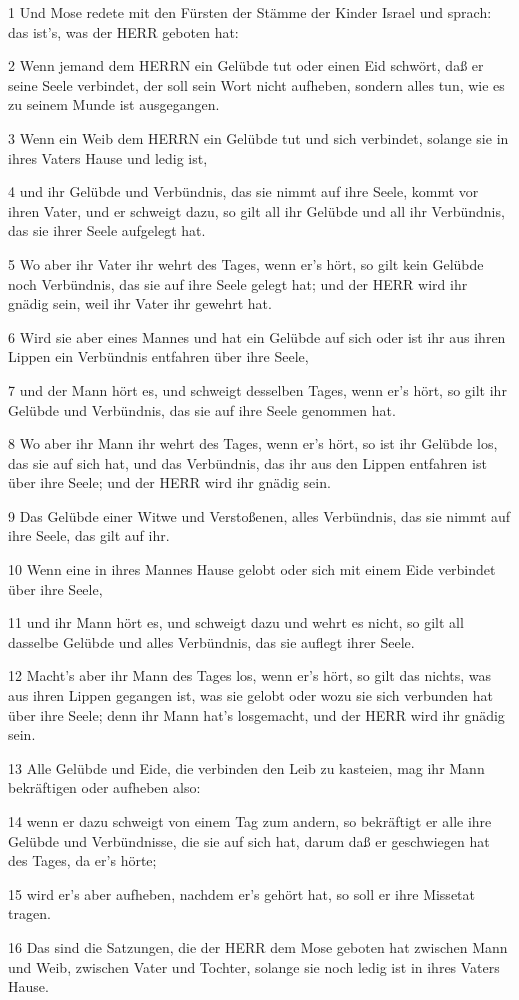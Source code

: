 \par 1 Und Mose redete mit den Fürsten der Stämme der Kinder Israel und sprach: das ist's, was der HERR geboten hat:
\par 2 Wenn jemand dem HERRN ein Gelübde tut oder einen Eid schwört, daß er seine Seele verbindet, der soll sein Wort nicht aufheben, sondern alles tun, wie es zu seinem Munde ist ausgegangen.
\par 3 Wenn ein Weib dem HERRN ein Gelübde tut und sich verbindet, solange sie in ihres Vaters Hause und ledig ist,
\par 4 und ihr Gelübde und Verbündnis, das sie nimmt auf ihre Seele, kommt vor ihren Vater, und er schweigt dazu, so gilt all ihr Gelübde und all ihr Verbündnis, das sie ihrer Seele aufgelegt hat.
\par 5 Wo aber ihr Vater ihr wehrt des Tages, wenn er's hört, so gilt kein Gelübde noch Verbündnis, das sie auf ihre Seele gelegt hat; und der HERR wird ihr gnädig sein, weil ihr Vater ihr gewehrt hat.
\par 6 Wird sie aber eines Mannes und hat ein Gelübde auf sich oder ist ihr aus ihren Lippen ein Verbündnis entfahren über ihre Seele,
\par 7 und der Mann hört es, und schweigt desselben Tages, wenn er's hört, so gilt ihr Gelübde und Verbündnis, das sie auf ihre Seele genommen hat.
\par 8 Wo aber ihr Mann ihr wehrt des Tages, wenn er's hört, so ist ihr Gelübde los, das sie auf sich hat, und das Verbündnis, das ihr aus den Lippen entfahren ist über ihre Seele; und der HERR wird ihr gnädig sein.
\par 9 Das Gelübde einer Witwe und Verstoßenen, alles Verbündnis, das sie nimmt auf ihre Seele, das gilt auf ihr.
\par 10 Wenn eine in ihres Mannes Hause gelobt oder sich mit einem Eide verbindet über ihre Seele,
\par 11 und ihr Mann hört es, und schweigt dazu und wehrt es nicht, so gilt all dasselbe Gelübde und alles Verbündnis, das sie auflegt ihrer Seele.
\par 12 Macht's aber ihr Mann des Tages los, wenn er's hört, so gilt das nichts, was aus ihren Lippen gegangen ist, was sie gelobt oder wozu sie sich verbunden hat über ihre Seele; denn ihr Mann hat's losgemacht, und der HERR wird ihr gnädig sein.
\par 13 Alle Gelübde und Eide, die verbinden den Leib zu kasteien, mag ihr Mann bekräftigen oder aufheben also:
\par 14 wenn er dazu schweigt von einem Tag zum andern, so bekräftigt er alle ihre Gelübde und Verbündnisse, die sie auf sich hat, darum daß er geschwiegen hat des Tages, da er's hörte;
\par 15 wird er's aber aufheben, nachdem er's gehört hat, so soll er ihre Missetat tragen.
\par 16 Das sind die Satzungen, die der HERR dem Mose geboten hat zwischen Mann und Weib, zwischen Vater und Tochter, solange sie noch ledig ist in ihres Vaters Hause.

